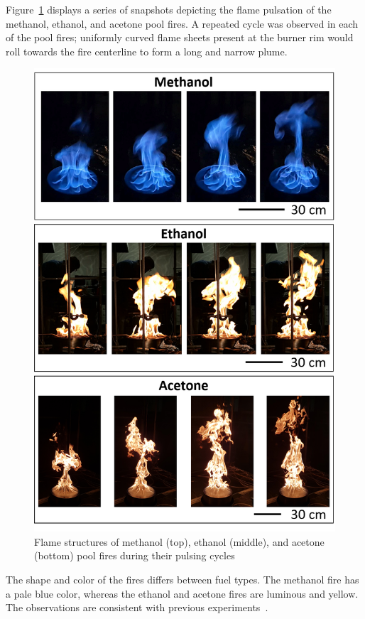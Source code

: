 \documentclass[12pt]{article}
\begin{document}
Figure~\ref{fig:Flame_Structure} displays a series of snapshots depicting the flame pulsation of the methanol, ethanol, and acetone pool fires. A repeated cycle was observed in each of the pool fires; uniformly curved flame sheets present at the burner rim would roll towards the fire centerline to form a long and narrow plume.
\begin{figure}[p]
	\centering
\includegraphics[width=5.0in,keepaspectratio]{Flame_Structure.png}
	\caption[Pool Fire Structures]{Flame structures of methanol (top), ethanol (middle), and acetone (bottom) pool fires during their pulsing cycles}
	\label{fig:Flame_Structure}
\end{figure}
The shape and color of the fires differs between fuel types. The methanol fire has a pale blue color, whereas the ethanol and acetone fires are luminous and yellow. The observations are consistent with previous experiments~\cite{Hamins2016,Kim2019,Weckman1996,Hamins1994,Hamins1991,Lock2008,Hogben1998}.
\end{document}
